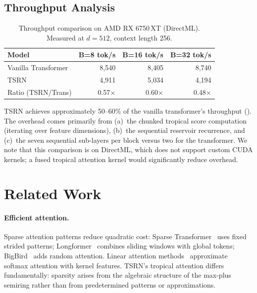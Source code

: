 \documentclass[11pt,a4paper]{article}
\begin{document}
\subsection{Throughput Analysis}
\label{sec:throughput}

\begin{table}[t]
\centering
\caption{Throughput comparison on AMD RX 6750\,XT (DirectML).
  Measured at $d{=}512$, context length 256.}
\label{tab:throughput}
\begin{tabular}{lrrr}
\toprule
\textbf{Model} & \textbf{B=8 tok/s} & \textbf{B=16 tok/s} &
  \textbf{B=32 tok/s} \\
\midrule
Vanilla Transformer & 8{,}540 & 8{,}405 & 8{,}740 \\
TSRN                & 4{,}911 & 5{,}034 & 4{,}194 \\
\midrule
Ratio (TSRN/Trans)  & 0.57$\times$ & 0.60$\times$ &
  0.48$\times$ \\
\bottomrule
\end{tabular}
\end{table}

TSRN achieves approximately 50--60\% of the vanilla transformer's
throughput ().  The overhead comes primarily from
(a)~the chunked tropical score computation (iterating over feature
dimensions), (b)~the sequential reservoir recurrence, and (c)~the
seven sequential sub-layers per block versus two for the transformer.
We note that this comparison is on DirectML, which does not support
custom CUDA kernels; a fused tropical attention kernel would
significantly reduce overhead.


\section{Related Work}
\label{sec:related}

\paragraph{Efficient attention.}
Sparse attention patterns reduce quadratic cost:
Sparse Transformer~\citep{child2019generating} uses fixed strided
patterns; Longformer~\citep{beltagy2020longformer} combines sliding
windows with global tokens; BigBird~\citep{zaheer2020bigbird} adds
random attention.  Linear attention
methods~\citep{katharopoulos2020transformers, choromanski2021rethinking}
approximate softmax attention with kernel features.  TSRN's tropical
attention differs fundamentally: sparsity arises from the algebraic
structure of the max-plus semiring rather than from predetermined
patterns or approximations.
\end{document}
